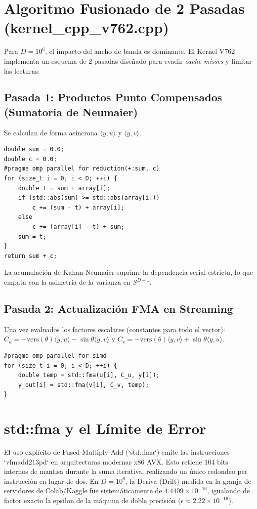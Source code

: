 \section{Algoritmo Fusionado de 2 Pasadas (kernel\_cpp\_v762.cpp)}
Para $D=10^6$, el impacto del ancho de banda es dominante. El Kernel V762 implementa un esquema de 2 pasadas diseñado para evadir \textit{cache misses} y limitar las lecturas:

\subsection{Pasada 1: Productos Punto Compensados (Sumatoria de Neumaier)}
Se calculan de forma asíncrona $\langle y, u \rangle$ y $\langle y, v \rangle$.
\begin{verbatim}
double sum = 0.0;
double c = 0.0;
#pragma omp parallel for reduction(+:sum, c)
for (size_t i = 0; i < D; ++i) {
    double t = sum + array[i];
    if (std::abs(sum) >= std::abs(array[i]))
        c += (sum - t) + array[i];
    else
        c += (array[i] - t) + sum;
    sum = t;
}
return sum + c;
\end{verbatim}
La acumulación de Kahan-Neumaier suprime la dependencia serial estricta, lo que empata con la asimetría de la varianza en $S^{D-1}$.

\subsection{Pasada 2: Actualización FMA en Streaming}
Una vez evaluados los factores escalares (constantes para todo el vector):
$C_u = -\text{vers}(\theta) \langle y, u \rangle - \sin\theta \langle y, v \rangle$ y
$C_v = -\text{vers}(\theta) \langle y, v \rangle + \sin\theta \langle y, u \rangle$.
\begin{verbatim}
#pragma omp parallel for simd
for (size_t i = 0; i < D; ++i) {
    double temp = std::fma(u[i], C_u, y[i]);
    y_out[i] = std::fma(v[i], C_v, temp);
}
\end{verbatim}

\section{std::fma y el Límite de Error}
El uso explícito de Fused-Multiply-Add (`std::fma`) emite las instrucciones `vfmadd213pd` en arquitecturas modernas x86 AVX. Esto retiene 104 bits internos de mantisa durante la suma iterativa, realizando un único redondeo per instrucción en lugar de dos. En $D=10^6$, la Deriva (Drift) medida en la granja de servidores de Colab/Kaggle fue sistemáticamente de $4.4409 \times 10^{-16}$, igualando de factor exacto la epsilon de la máquina de doble precisión ($\epsilon \approx 2.22 \times 10^{-16}$).

